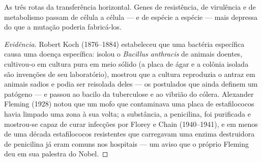 \begin{omfigure}

{\small As três rotas da transferência horizontal. Genes de
resistência, de virulência e de metabolismo passam de célula a célula
--- e de espécie a espécie --- mais depressa do que a mutação poderia
fabricá-los.}
\end{omfigure}

\begin{proof}[Evidência]
Robert Koch (1876--1884) estabeleceu que uma bactéria específica causa
uma doença específica: isolou o \emph{Bacillus anthracis} de animais
doentes, cultivou-o em cultura pura em meio sólido (a placa de ágar e a
colônia isolada são invenções de seu laboratório), mostrou que a
cultura reproduzia o antraz em animais sadios e podia ser reisolada
deles --- os postulados que ainda definem um patógeno --- e passou ao
bacilo da tuberculose e ao vibrião do cólera. Alexander Fleming (1928)
notou que um mofo que contaminava uma placa de estafilococos havia
limpado uma zona à sua volta; a substância, a penicilina, foi
purificada e mostrou-se capaz de curar infecções por Florey e Chain
(1940--1941), e em menos de uma década estafilococos resistentes que
carregavam uma enzima destruidora de penicilina já eram comuns nos
hospitais --- um aviso que o próprio Fleming deu em sua palestra do
Nobel.
\end{proof}

